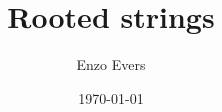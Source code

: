 \documentclass{book}
\title{Rooted strings}
\author{Enzo Evers}
\date{\today}
\begin{document}
%

\maketitle

\tableofcontents


\newpage

\newpage

\newpage

\newpage

\newpage

\newpage

\newpage



\printbibliography

\begin{appendices}

\newpage

\end{appendices}
\end{document}
